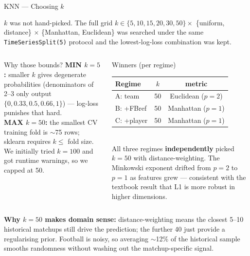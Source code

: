 \begin{frame}{KNN — Choosing $k$}

  \footnotesize $k$ was not hand-picked. The full grid
  $k \in \{5, 10, 15, 20, 30, 50\} \times$ \{uniform, distance\}
  $\times$ \{Manhattan, Euclidean\} was searched under the same
  \texttt{TimeSeriesSplit(5)} protocol and the lowest-log-loss
  combination was kept.

  \vspace{0.4em}
  \begin{columns}[T]
    \begin{block}{Why those bounds?}
      \scriptsize
      \textbf{MIN $k=5$:} smaller $k$ gives degenerate probabilities
      (denominators of 2--3 only output $\{0, 0.33, 0.5, 0.66, 1\}$)
      — log-loss punishes that hard.\\[0.3em]
      \textbf{MAX $k=50$:} the smallest CV training fold is $\sim$75 rows;
      sklearn requires $k \le$ fold size. We initially tried $k=100$
      and got runtime warnings, so we capped at 50.
    \end{block}

    \begin{block}{Winners (per regime)}
      \scriptsize
      \setlength{\tabcolsep}{4pt}
      \begin{tabular}{lcc}
        Regime & $k$ & metric \\
        \hline
        A: team   & 50 & Euclidean ($p{=}2$) \\
        B: +FBref & 50 & Manhattan ($p{=}1$) \\
        C: +player& 50 & Manhattan ($p{=}1$) \\
      \end{tabular}\\[0.4em]
      All three regimes \textbf{independently} picked $k=50$ with
      distance-weighting. The Minkowski exponent drifted from
      $p{=}2$ to $p{=}1$ as features grew — consistent with the
      textbook result that L1 is more robust in higher dimensions.
    \end{block}
  \end{columns}

  \vspace{0.4em}
  \footnotesize\textbf{Why $k=50$ makes domain sense:} distance-weighting
  means the closest 5--10 historical matchups still drive the
  prediction; the further 40 just provide a regularising prior.
  Football is noisy, so averaging $\sim$12\% of the historical sample
  smooths randomness without washing out the matchup-specific signal.
\end{frame}